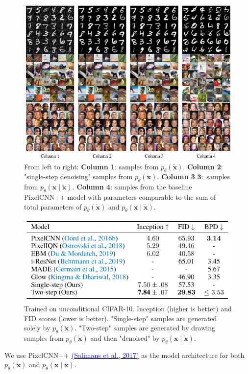 \documentclass[t]{beamer}  %
\begin{document}
\begin{frame}
\begin{figure}[h]
    \centering
    
    \includegraphics[scale=0.65]{columns.pdf}
    \caption[c]{From left to right: \textbf{Column 1}: samples from $p_{\theta}(\tilde{\bm{x}})$. \textbf{Column 2}: "single-step denoising" samples from $p_{\theta}(\tilde{\bm{x}}) .$ \textbf{Column 3} $\bm{3}:$ samples from $p_{\theta}(\bm{x} \mid \tilde{\bm{x}}) .$ \textbf{Column 4}: samples from the baseline PixelCNN++ model with parameters comparable to the sum of total parameters of $p_{\theta}(\tilde{\bm{x}})$ and $p_{\theta}(\bm{x} \mid \tilde{\bm{x}})$. }
\end{figure}
\end{frame}

\begin{frame}
\begin{figure}[h]
    \centering
    
    \includegraphics{scores.pdf}
    \caption[c]{Trained on unconditional CIFAR-10. Inception (higher is better) and FID scores (lower is better). "Single-step" samples are generated solely by $p_{\theta}(\tilde{\bm{x}})$. "Two-step" samples are generated by drawing samples from $p_{\theta}(\tilde{\bm{x}})$ and then "denoised" by $p_{\theta}(\bm{x} \mid \tilde{\bm{x}})$.}
\end{figure}
We use PixelCNN++ \href{https://arxiv.org/pdf/1701.05517.pdf}{\textcolor{blue}{(Salimans et al., 2017)}} as the model architecture for both $p_{\theta}(\tilde{\bm{x}})$ and $p_{\theta}(\bm{x} \mid \tilde{\bm{x}}).$
\end{frame}
\end{document}
